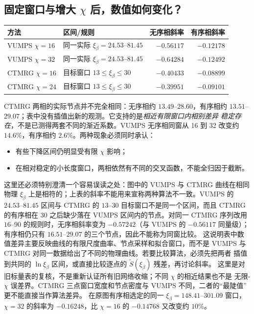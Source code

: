 \documentclass[11pt]{article}
\newcommand{\xb}{\xi_\beta}
\begin{document}
\subsection{固定窗口与增大 $\chi$ 后，数值如何变化？}
\begin{center}\small
\begin{tabular}{llrr}
\toprule
方法 & 区间/规则 & 无序相斜率 & 有序相斜率\\
\midrule
VUMPS $\chi=16$ & 同一实际 $\xb=24.53$--$81.45$ & $-0.56117$ & $-0.12178$\\
VUMPS $\chi=32$ & 同一实际 $\xb=24.53$--$81.45$ & $-0.64284$ & $-0.12492$\\
CTMRG $\chi=16$ & 目标窗口 $13\le\xb\le30$ & $-0.40433$ & $-0.08899$\\
CTMRG $\chi=24$ & 目标窗口 $13\le\xb\le30$ & $-0.39951$ & $-0.09101$\\
\bottomrule
\end{tabular}
\end{center}
CTMRG 两相的实际节点并不完全相同：无序相约 $13.49$--$28.60$，有序相约
$13.51$--$29.07$；表中没有插值出新的观测。它支持的是\emph{相近有限窗口内相别差异
稳定存在}，不是已测得两套不同的渐近系数。VUMPS 无序相同窗从 16 到 32 改变约
$14.6\%$，有序相约 $2.6\%$。两种现象必须同时承认：
\begin{itemize}
\item 有些下降区间仍明显受有限 $\chi$ 影响；
\item 在相对稳定的小长度窗口，两相依然有不同的交叉函数，不能全归因于截断。
\end{itemize}
这里还必须特别澄清一个容易误读之处：图中的 VUMPS 与 CTMRG 曲线在相同物理
$\xb$ 上是相符的；上表的斜率不能用来宣称两种算法不一致。VUMPS 的
$24.53$--$81.45$ 区间与 CTMRG 的 $13$--$30$ 目标窗口不是同一个区间，而且
CTMRG 的有序相在 $30$ 之后缺少落在 VUMPS 区间内的节点。对同一 CTMRG 序列改用
$16$--$90$ 的规则时，无序相斜率变为 $-0.57242$（与 VUMPS 的 $-0.56117$
同量级）；有序相仍只有 $16.51$--$29.07$ 的三个节点，因此不能称为同窗比较。
这说明表中数值差异主要反映曲线的有限尺度曲率、节点采样和拟合窗口，而不是
VUMPS 与 CTMRG 对同一数据给出了不同的物理曲线。若要比较算法，必须先把两者
插值到共同的 $\ln\xb$ 区间，或直接比较逐点的 $\widetilde S(\xb)$ 残差，再讨论斜率。
这里是对旧标量表的复核，不是重新认证所有旧网络收缩；不同 $\chi$ 的相近结果也不是
无限-$\chi$ 误差界。CTMRG 三点窗口宽度和节点密度与 VUMPS 不同，二者的“最陡值”
更不能直接当作算法差异。
在原图有序相选定的同一 $\xb=148.41$--$301.09$ 窗口，$\chi=32$ 的斜率为
$-0.16248$，比 $\chi=16$ 的 $-0.14768$ 又改变约 $10\%$。
\end{document}
